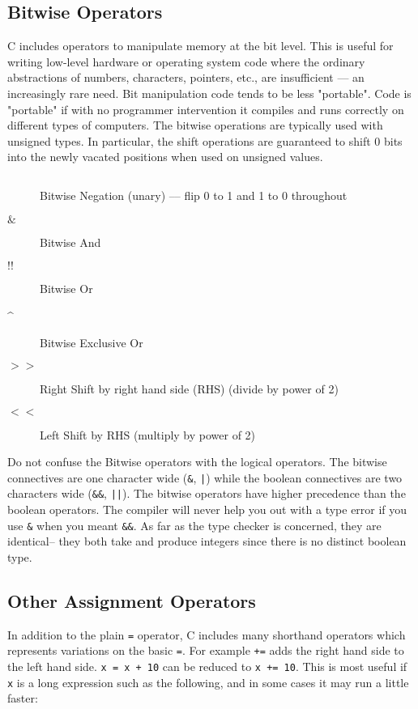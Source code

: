 \subsection{Bitwise Operators}

C includes operators to manipulate memory at the bit level. This is useful for writing low-level hardware or operating system code where the ordinary abstractions of numbers, characters, pointers, etc., are insufficient --- an increasingly rare need. Bit manipulation code tends to be less "portable". Code is "portable" if with no programmer intervention it compiles and runs correctly on different types of computers. The bitwise operations are typically used with unsigned types. In particular, the shift operations are guaranteed to shift 0 bits into the newly vacated positions when used on unsigned values.

\begin{description}
\item[$~$] Bitwise Negation (unary) --– flip 0 to 1 and 1 to 0 throughout
\item[$\&$] Bitwise And
\item[$!!$] Bitwise Or
\item[\^] Bitwise Exclusive Or
\item[$>>$] Right Shift by right hand side (RHS) (divide by power of 2)
\item[$<<$] Left Shift by RHS (multiply by power of 2)
\end{description}

Do not confuse the Bitwise operators with the logical operators. The bitwise connectives are one character wide (\lstinline{&}, \lstinline{|}) while the boolean connectives are two characters wide (\lstinline{&&}, \lstinline{||}). The bitwise operators have higher precedence than the boolean operators. The compiler will never help you out with a type error if you use \lstinline{&} when you meant \lstinline{&&}. As far as the type checker is concerned, they are identical-- they both take and produce integers since there is no distinct boolean type.

\subsection{Other Assignment Operators}

In addition to the plain \lstinline{=} operator, C includes many shorthand operators which represents variations on the basic \lstinline{=}. For example \lstinline{+=} adds the right hand side to the left hand side. \lstinline{x = x + 10} can be reduced to \lstinline{x += 10}. This is most useful if \lstinline{x} is a long expression such as the following, and in some cases it may run a little faster:

